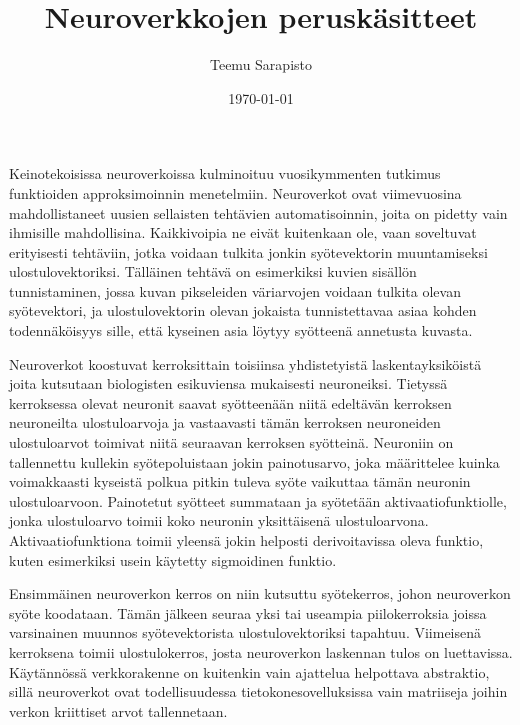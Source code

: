 \documentclass[finnish]{tktltiki2}
\title{Neuroverkkojen peruskäsitteet}
\author{Teemu Sarapisto}
\date{\today}
\begin{document}


  \maketitle



  \mainmatter       %

  Keinotekoisissa neuroverkoissa kulminoituu vuosikymmenten tutkimus funktioiden approksimoinnin menetelmiin. Neuroverkot ovat viimevuosina mahdollistaneet uusien sellaisten tehtävien automatisoinnin, joita on pidetty vain ihmisille mahdollisina. Kaikkivoipia ne eivät kuitenkaan ole, vaan soveltuvat erityisesti tehtäviin, jotka voidaan tulkita jonkin syötevektorin muuntamiseksi ulostulovektoriksi. Tälläinen tehtävä on esimerkiksi kuvien sisällön tunnistaminen, jossa kuvan pikseleiden väriarvojen voidaan tulkita olevan syötevektori, ja ulostulovektorin olevan jokaista tunnistettavaa asiaa kohden todennäköisyys sille, että kyseinen asia löytyy syötteenä annetusta kuvasta.

  Neuroverkot koostuvat kerroksittain toisiinsa yhdistetyistä laskentayksiköistä joita kutsutaan biologisten esikuviensa mukaisesti neuroneiksi. Tietyssä kerroksessa olevat neuronit saavat syötteenään niitä edeltävän kerroksen neuroneilta ulostuloarvoja ja vastaavasti tämän kerroksen neuroneiden ulostuloarvot toimivat niitä seuraavan kerroksen syötteinä. Neuroniin on tallennettu kullekin syötepoluistaan jokin painotusarvo, joka määrittelee kuinka voimakkaasti kyseistä polkua pitkin tuleva syöte vaikuttaa tämän neuronin ulostuloarvoon. Painotetut syötteet summataan ja syötetään aktivaatiofunktiolle, jonka ulostuloarvo toimii koko neuronin yksittäisenä ulostuloarvona. Aktivaatiofunktiona toimii yleensä jokin helposti derivoitavissa oleva funktio, kuten esimerkiksi usein käytetty sigmoidinen funktio.

   Ensimmäinen neuroverkon kerros on niin kutsuttu syötekerros, johon neuroverkon syöte koodataan. Tämän jälkeen seuraa yksi tai useampia piilokerroksia joissa varsinainen muunnos syötevektorista ulostulovektoriksi tapahtuu. Viimeisenä kerroksena toimii ulostulokerros, josta neuroverkon laskennan tulos on luettavissa. Käytännössä verkkorakenne on kuitenkin vain ajattelua helpottava abstraktio, sillä neuroverkot ovat todellisuudessa tietokonesovelluksissa vain matriiseja joihin verkon kriittiset arvot tallennetaan.

\end{document}
